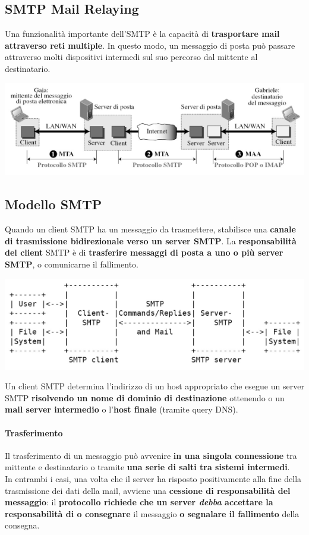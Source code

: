 \documentclass[10pt]{article}
\begin{document}
\subsection{SMTP Mail Relaying}
Una funzionalità importante dell'SMTP è la capacità di \textbf{trasportare mail attraverso reti multiple}. In questo modo, un messaggio di posta può passare attraverso molti dispositivi intermedi sul suo percorso dal mittente al destinatario.
\begin{center}
\includegraphics[scale=0.9]{smtpmailrelaying.png}
\end{center}
\pagebreak
\subsection{Modello SMTP}
Quando un client SMTP ha un messaggio da trasmettere, stabilisce una \textbf{canale di trasmissione bidirezionale verso un server SMTP}. La \textbf{responsabilità del client} SMTP è di \textbf{trasferire messaggi di posta a uno o più server SMTP}, o comunicarne il fallimento.
\begin{center}
\includegraphics[scale=0.7]{smtpmodello.png}\\
\end{center}
Un client SMTP determina l'indirizzo di un host appropriato che esegue un server SMTP \textbf{risolvendo un nome di dominio di destinazione} ottenendo o un \textbf{mail server intermedio} o l'\textbf{host finale} (tramite query DNS).
\paragraph{Trasferimento} Il trasferimento di un messaggio può avvenire \textbf{in una singola connessione} tra mittente e destinatario o tramite \textbf{una serie di salti tra sistemi intermedi}.\\
In entrambi i casi, una volta che il server ha risposto positivamente alla fine della trasmissione dei dati della mail, avviene una \textbf{cessione di responsabilità del messaggio}: il \textbf{protocollo richiede che un server \textit{debba} accettare la responsabilità di o consegnare} il messaggio \textbf{o segnalare il fallimento} della consegna.
\end{document}
